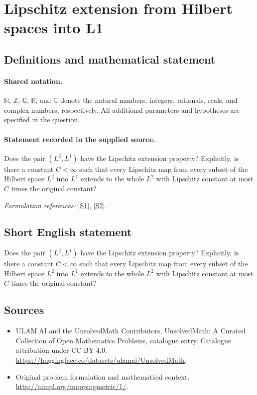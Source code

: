 \documentclass[11pt]{article}
\newcommand{\sref}[2]{\hyperlink{source:#1:#2}{[S#2]}}
\begin{document}
\section{Lipschitz extension from Hilbert spaces into L1}\label{statement}

\subsection{Definitions and mathematical statement}

\paragraph{Shared notation.}$\mathbb N$, $\mathbb Z$, $\mathbb Q$, $\mathbb R$, and $\mathbb C$ denote the natural numbers, integers, rationals, reals, and complex numbers, respectively. All additional parameters and hypotheses are specified in the question.


\paragraph{Statement recorded in the supplied source.}
Does the pair $(L^2,L^1)$ have the Lipschitz extension property? Explicitly, is there a constant $C<\infty$ such that every Lipschitz map from every subset of the Hilbert space $L^2$ into $L^1$ extends to the whole $L^2$ with Lipschitz constant at most $C$ times the original constant?
\par\smallskip\textit{Formulation references:} \sref{statement}{1}, \sref{statement}{2}.
\subsection{Short English statement}
Does the pair $(L^2,L^1)$ have the Lipschitz extension property? Explicitly, is there a constant $C<\infty$ such that every Lipschitz map from every subset of the Hilbert space $L^2$ into $L^1$ extends to the whole $L^2$ with Lipschitz constant at most $C$ times the original constant?
\subsection{Sources}
\begin{itemize}
\item[\hypertarget{source:statement:1}{S1}] ULAM.AI and the UnsolvedMath Contributors, UnsolvedMath: A Curated Collection of Open Mathematics Problems, catalogue entry. Catalogue attribution under CC BY 4.0.
\url{https://huggingface.co/datasets/ulamai/UnsolvedMath}.
\item[\hypertarget{source:statement:2}{S2}] Original problem formulation and mathematical context.
\url{http://aimpl.org/mappingmetric/1/}.
\end{itemize}
\label{end:statement}
\end{document}
